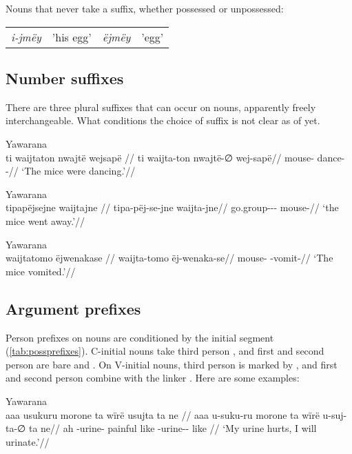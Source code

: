 \documentclass{memoir}
\begin{document}
\ex\label{unsuffixednouns} Nouns that never take a suffix, whether
possessed or unpossessed:

\begin{tabular}[t]{llll}

\emph{i-jmëy} & 'his egg’ & \emph{ëjmëy} & 'egg’ \\

\end{tabular}
 \xe

\subsection{\texorpdfstring{Number suffixes
\label{sec:nominalnumber}}{Number suffixes }}

There are three plural suffixes that can occur on nouns, apparently
freely interchangeable. What conditions the choice of suffix is not
clear as of yet.

\ex Yawarana \\
\label{ctorat-09}\begingl
\glpreamble  ti waijtaton nwajtë wejsapë //
\gla ti waijta-ton nwajtë-∅ wej-sapë//
\glb {} mouse- dance- -//
\glft ‘The mice were dancing.’//  
\endgl 
\xe

\ex Yawarana \\
\label{ctorat-40}\begingl
\glpreamble  tipapëjsejne waijtajne //
\gla tipa-pëj-se-jne waijta-jne//
\glb go.group--- mouse-//
\glft ‘the mice went away.’//  
\endgl 
\xe

\ex Yawarana \\
\label{ctorat-17}\begingl
\glpreamble  waijtatomo ëjwenakase //
\gla waijta-tomo ëj-wenaka-se//
\glb mouse- -vomit-//
\glft ‘The mice vomited.’//  
\endgl 
\xe

\subsection{\texorpdfstring{Argument prefixes
\label{sec:nominalperson}}{Argument prefixes }}

Person prefixes on nouns are conditioned by the initial segment
(\cref{tab:possprefixes}). C-initial nouns take third person ,
and first and second person are bare  and . On
V-initial nouns, third person is marked by , and first and
second person combine with the linker . Here are some examples:

\ex Yawarana \\
\label{ctorat-23}\begingl
\glpreamble  aaa usukuru morone ta wïrë usujta ta ne //
\gla aaa u-suku-ru morone ta wïrë u-suj-ta-∅ ta ne//
\glb ah -urine- painful like  -urine-- like //
\glft ‘My urine hurts, I will urinate.’//  
\endgl 
\xe
\end{document}
